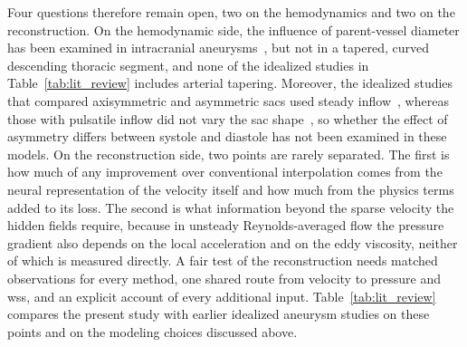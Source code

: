 \documentclass[12pt,a4paper]{article}
\newcommand{\WSS}{\ac{wss}\xspace}
\theoremstyle{definition}
\numberwithin{equation}{section}
\begin{document}
Four questions therefore remain open, two on the hemodynamics and two on the reconstruction. On the hemodynamic side, the influence of parent-vessel diameter has been examined in intracranial aneurysms~\cite{fattahi2023influence}, but not in a tapered, curved descending thoracic segment, and none of the idealized studies in Table~\ref{tab:lit_review} includes arterial tapering. Moreover, the idealized studies that compared axisymmetric and asymmetric sacs used steady inflow~\cite{rehman2024comparative,rehman2025application,moroni2025insight}, whereas those with pulsatile inflow did not vary the sac shape~\cite{jin2021arterial,guerrero2023efficient}, so whether the effect of asymmetry differs between systole and diastole has not been examined in these models. On the reconstruction side, two points are rarely separated. The first is how much of any improvement over conventional interpolation comes from the neural representation of the velocity itself and how much from the physics terms added to its loss. The second is what information beyond the sparse velocity the hidden fields require, because in unsteady Reynolds-averaged flow the pressure gradient also depends on the local acceleration and on the eddy viscosity, neither of which is measured directly. A fair test of the reconstruction needs matched observations for every method, one shared route from velocity to pressure and \WSS, and an explicit account of every additional input. Table~\ref{tab:lit_review} compares the present study with earlier idealized aneurysm studies on these points and on the modeling choices discussed above.
\end{document}
